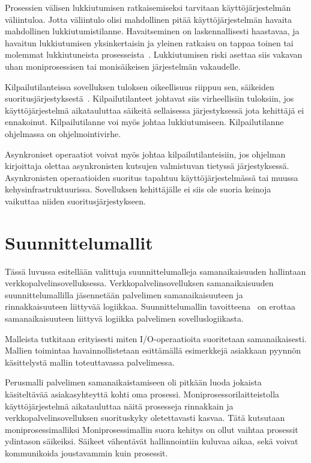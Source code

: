 \documentclass[finnish]{tktltiki2}%
\theoremstyle{definition}
\theoremstyle{remark}
\begin{document}
Prosessien välisen lukkiutumisen ratkaisemiseksi tarvitaan
käyttöjärjestelmän väliintuloa. Jotta väliintulo olisi mahdollinen pitää
käyttöjärjestelmän havaita mahdollinen lukkiutumistilanne.
Havaitseminen on laskennallisesti haastavaa, ja havaitun lukkiutumisen
yksinkertaisin ja yleinen ratkaisu on tappaa toinen
tai molemmat lukkiutuneista prosesseista~\cite{stallings_operating_2018}.
Lukkiutumisen riski asettaa siis vakavan uhan moniprosessisen tai monisäikeisen
järjestelmän vakaudelle.

Kilpailutilanteissa sovelluksen tuloksen oikeellisuus riippuu sen,
säikeiden suoritusjärjestyksestä~\cite{stallings_operating_2018}.
Kilpailutilanteet johtavat siis
virheellisiin tuloksiin, jos käyttöjärjestelmä aikatauluttaa
säikeitä sellaisessa järjestyksessä jota kehittäjä ei ennakoinut.
Kilpailutilanne voi myös johtaa lukkiutumiseen.
Kilpailutilanne ohjelmassa on ohjelmointivirhe.

Asynkroniset operaatiot voivat myös johtaa kilpailutilanteisiin,
jos ohjelman kirjoittaja olettaa asynkronisten kutsujen
valmistuvan tietyssä järjestyksessä. Asynkronisten operaatioiden
suoritus tapahtuu käyttöjärjestelmässä tai muussa kehysinfrastruktuurissa.
Sovelluksen kehittäjälle ei siis ole suoria keinoja vaikuttaa
niiden suoritusjärjestykseen.

\section{Suunnittelumallit}\label{sec:SM}

Tässä luvussa esitellään valittuja
suunnittelumalleja samanaikaisuuden
hallintaan verkkopalvelinsovelluksessa.
Verkkopalvelinsovelluksen samanaikaisuuden suunnittelumallilla
jäsennetään palvelimen samanaikaisuuteen ja rinnakkaisuuteen
liittyvää logiikkaa. Suunnittelumallin tavoitteena~\cite{hu_applying_1998} on
erottaa samanaikaisuuteen liittyvä logiikka 
palvelimen sovelluslogiikasta.


Malleista tutkitaan erityisesti miten I/O-operaatioita
suoritetaan samanaikaisesti. Mallien toimintaa havainnollistetaan
esittämällä esimerkkejä asiakkaan pyynnön käsittelystä mallin
toteuttavassa palvelimessa.


Perusmalli palvelimen samanaikaistamiseen oli pitkään
luoda jokaista käsiteltävää asiakasyhteyttä kohti
oma prosessi. Moniprosessorilaitteistolla käyttöjärjestelmä
aikatauluttaa näitä prosesseja rinnakkain ja verkkopalvelinsovelluksen
suorituskyky oletettavasti kasvaa. Tätä kutsutaan moniprosessimalliksi
Moniprosessimallin suora kehitys on ollut vaihtaa prosessit ydintason
säikeiksi.
Säikeet vähentävät hallinnointiin kuluvaa aikaa, sekä
voivat kommunikoida joustavammin kuin prosessit.
\end{document}
